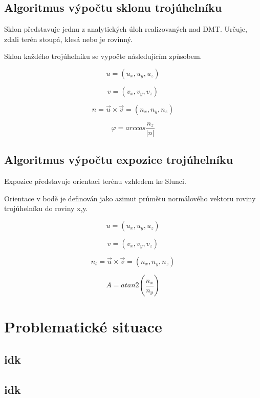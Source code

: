 \documentclass[11pt]{article}
\begin{document}
\subsection{Algoritmus výpočtu sklonu trojúhelníku}
Sklon představuje jednu z analytických úloh realizovaných nad DMT. Určuje, zdali terén stoupá, klesá nebo je rovinný.

Sklon každého trojúhelníku se vypočte následujícím způsobem.

$$  u = (u_x, u_y, u_z)
$$

$$  v = (v_x, v_y, v_z)
$$

$$ n = \vec{u}\times \vec{v} = (n_x, n_y, n_z)$$
  
$$ \varphi = arccos \frac{n_z}{|n|} $$ 



\subsection{Algoritmus výpočtu expozice trojúhelníku}
Expozice představuje orientaci terénu vzhledem ke Slunci.

Orientace v bodě je definován jako azimut průmětu normálového vektoru roviny trojúhelníku do roviny x,y.


$$  u = (u_x, u_y, u_z)
$$

$$  v = (v_x, v_y, v_z)
$$

$$ n_t = \vec{u}\times \vec{v} = (n_x, n_y, n_z)$$

$$ A =atan2( \frac{n_x}{n_y}) $$

\section{Problematické situace}

\subsection{idk}


\subsection{idk}

\clearpage



\end{document}
